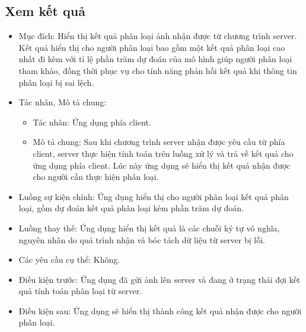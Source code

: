 \subsection{Xem kết quả}
\begin{itemize}
	\item Mục đích: Hiển thị kết quả phân loại ảnh nhận được từ chương trình server. Kết quả hiển thị cho người phân loại bao gồm một kết quả phân loại cao nhất đi kèm với tỉ lệ phần trăm dự đoán của mô hình giúp người phân loại tham khảo, đồng thời phục vụ cho tính năng	phản hồi kết quả khi thông tin phân loại bị sai lệch.
	\item Tác nhân, Mô tả chung:
	\begin{itemize}
		\item Tác nhân: Ứng dụng phía client.
		\item Mô tả chung: Sau khi chương trình server nhận được yêu cầu từ phía client, server thực hiện tính toán trên luồng xử lý và trả về kết quả cho ứng dụng phía client. Lúc này ứng dụng sẽ hiển thị kết quả nhận được cho người cần thực hiện phân loại.
	\end{itemize}	
	\item Luồng sự kiện chính: Ứng dụng hiển thị cho người phân loại kết quả phân loại, gồm dự đoán kết quả phân loại kèm phần trăm dự đoán.
	\item Luồng thay thế: Ứng dụng hiển thị kết quả là các chuỗi ký tự vô nghĩa, nguyên	nhân do quá trình nhận và bóc tách dữ liệu từ server bị lỗi. 
	\item Các yêu cầu cụ thể: Không.
	\item Điều kiện trước: Ứng dụng đã gửi ảnh lên server và đang ở trạng thái đợi kết quả tính toán phân loại từ server.
	\item Điều kiện sau: Ứng dụng sẽ hiển thị thành công kết quả nhận được cho người phân loại.
\end{itemize}